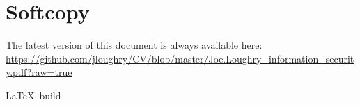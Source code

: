 \documentclass[12pt,twoside,letterpaper]{article}
\begin{document}
\vspace{-4mm}
\section*{Softcopy}
\vspace{-2mm}
The latest version of this document is always available here:
\url{https://github.com/jloughry/CV/blob/master/Joe.Loughry_information_security.pdf?raw=true}

\vfill
{\tiny \LaTeX\ build }
\end{document}
